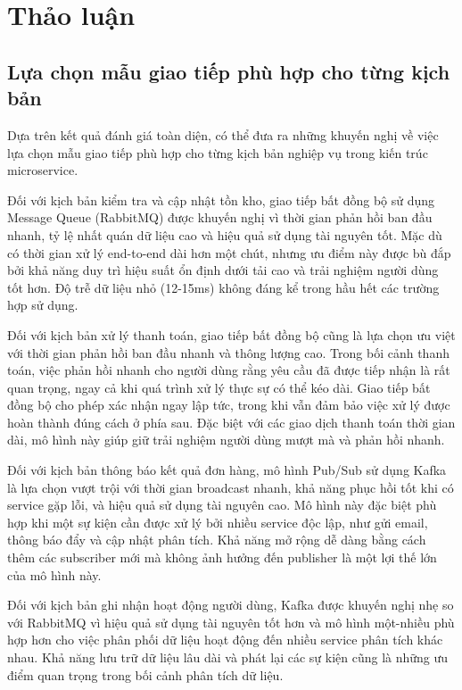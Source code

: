 \section{Thảo luận}

\subsection{Lựa chọn mẫu giao tiếp phù hợp cho từng kịch bản}
Dựa trên kết quả đánh giá toàn diện, có thể đưa ra những khuyến nghị về việc lựa chọn mẫu giao tiếp phù hợp cho từng kịch bản nghiệp vụ trong kiến trúc microservice.

Đối với kịch bản kiểm tra và cập nhật tồn kho, giao tiếp bất đồng bộ sử dụng Message Queue (RabbitMQ) được khuyến nghị vì thời gian phản hồi ban đầu nhanh, tỷ lệ nhất quán dữ liệu cao và hiệu quả sử dụng tài nguyên tốt. Mặc dù có thời gian xử lý end-to-end dài hơn một chút, nhưng ưu điểm này được bù đắp bởi khả năng duy trì hiệu suất ổn định dưới tải cao và trải nghiệm người dùng tốt hơn. Độ trễ dữ liệu nhỏ (12-15ms) không đáng kể trong hầu hết các trường hợp sử dụng.

Đối với kịch bản xử lý thanh toán, giao tiếp bất đồng bộ cũng là lựa chọn ưu việt với thời gian phản hồi ban đầu nhanh và thông lượng cao. Trong bối cảnh thanh toán, việc phản hồi nhanh cho người dùng rằng yêu cầu đã được tiếp nhận là rất quan trọng, ngay cả khi quá trình xử lý thực sự có thể kéo dài. Giao tiếp bất đồng bộ cho phép xác nhận ngay lập tức, trong khi vẫn đảm bảo việc xử lý được hoàn thành đúng cách ở phía sau. Đặc biệt với các giao dịch thanh toán thời gian dài, mô hình này giúp giữ trải nghiệm người dùng mượt mà và phản hồi nhanh.

Đối với kịch bản thông báo kết quả đơn hàng, mô hình Pub/Sub sử dụng Kafka là lựa chọn vượt trội với thời gian broadcast nhanh, khả năng phục hồi tốt khi có service gặp lỗi, và hiệu quả sử dụng tài nguyên cao. Mô hình này đặc biệt phù hợp khi một sự kiện cần được xử lý bởi nhiều service độc lập, như gửi email, thông báo đẩy và cập nhật phân tích. Khả năng mở rộng dễ dàng bằng cách thêm các subscriber mới mà không ảnh hưởng đến publisher là một lợi thế lớn của mô hình này.

Đối với kịch bản ghi nhận hoạt động người dùng, Kafka được khuyến nghị nhẹ so với RabbitMQ vì hiệu quả sử dụng tài nguyên tốt hơn và mô hình một-nhiều phù hợp hơn cho việc phân phối dữ liệu hoạt động đến nhiều service phân tích khác nhau. Khả năng lưu trữ dữ liệu lâu dài và phát lại các sự kiện cũng là những ưu điểm quan trọng trong bối cảnh phân tích dữ liệu.

